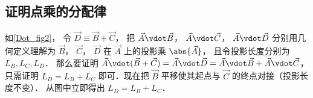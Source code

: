 \subsection{证明点乘的分配律}

如\autoref{Dot_fig2}， 令 $\vec D \equiv \vec B + \vec C$， 把 $\vec A \vdot \vec B$，  $\vec A \vdot \vec C$，  $\vec A \vdot \vec D$ 分别用几何定义理解为 $\vec B$，  $\vec C$，  $\vec D$ 在 $\vec A$ 上的投影乘 $\abs{\vec A}$， 且令投影长度分别为 $L_B, L_C, L_D$． 那么要证明 $\vec A \vdot (\vec B + \vec C) = \vec A \vdot \vec D = \vec A \vdot \vec B + \vec A \vdot \vec C$， 只需证明 $L_D = L_B + L_C$ 即可．现在把 $\vec B$ 平移使其起点与 $\vec C$ 的终点对接（投影长度不变）． 从图中立即得出 $L_D = L_B + L_C$．  








